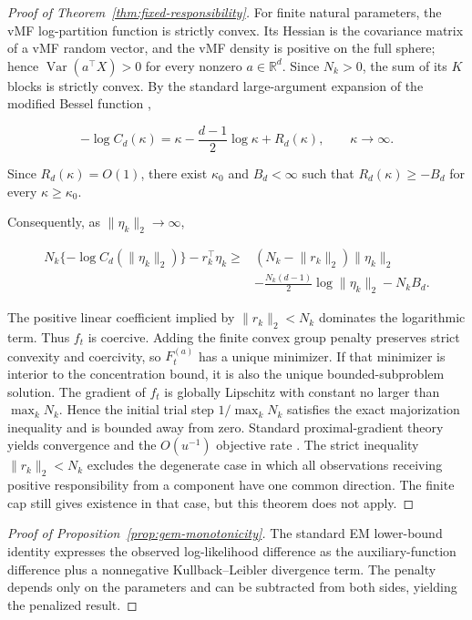 \documentclass[preprint,12pt,authoryear]{elsarticle}
\begin{document}
\begin{proof}[Proof of Theorem~\ref{thm:fixed-responsibility}]
For finite natural parameters, the vMF log-partition function is strictly
convex. Its Hessian is the covariance matrix of a vMF random vector, and the
vMF density is positive on the full sphere; hence
$\operatorname{Var}(a^\top X)>0$ for every nonzero $a\in\mathbb R^d$.
Since $N_k>0$, the sum of its $K$ blocks is strictly convex. By the standard
large-argument expansion of the modified Bessel function
\citep[Sec.~10.40]{olver2010nist},

\[
-\log C_d(\kappa)
=\kappa-\frac{d-1}{2}\log\kappa+R_d(\kappa),
\qquad \kappa\longrightarrow\infty.
\]

Since $R_d(\kappa)=O(1)$, there exist $\kappa_0$ and $B_d<\infty$ such that
$R_d(\kappa)\geq-B_d$ for every $\kappa\geq\kappa_0$.

Consequently, as $\lVert\eta_k\rVert_2\to\infty$,

\[
\begin{aligned}
N_k\{-\log C_d(\lVert\eta_k\rVert_2)\}
-r_k^\top\eta_k
\geq{}&
(N_k-\lVert r_k\rVert_2)\lVert\eta_k\rVert_2
\\
&-\frac{N_k(d-1)}{2}\log\lVert\eta_k\rVert_2
-N_kB_d.
\end{aligned}
\]

The positive linear coefficient implied by
$\lVert r_k\rVert_2<N_k$ dominates the logarithmic term. Thus $f_t$ is
coercive. Adding the finite convex group penalty preserves strict convexity and
coercivity, so $F_t^{(a)}$ has a unique minimizer. If that minimizer is interior to
the concentration bound, it is also the unique bounded-subproblem solution.
The gradient of $f_t$ is globally Lipschitz with constant no larger than
$\max_kN_k$. Hence the initial trial step $1/\max_kN_k$ satisfies the exact
majorization inequality and is bounded away from zero. Standard
proximal-gradient theory yields convergence and the $O(u^{-1})$ objective rate
\citep{beck2009fista}. The strict inequality
$\lVert r_k\rVert_2<N_k$ excludes the degenerate case in which all
observations receiving positive responsibility from a component have one
common direction. The finite cap still gives existence in that case, but
this theorem does not apply.
\end{proof}

\begin{proof}[Proof of Proposition~\ref{prop:gem-monotonicity}]
The standard EM lower-bound identity
\citep{dempster1977em,green1990penalizedem} expresses the observed
log-likelihood difference as the auxiliary-function difference plus a
nonnegative Kullback--Leibler divergence term. The penalty depends only on the
parameters and can be subtracted from both sides, yielding the penalized
result.
\end{proof}
\end{document}
